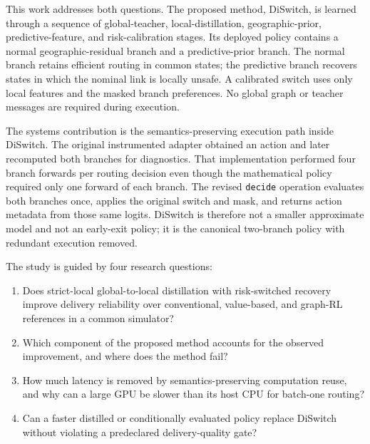 \documentclass{ieeeaccess}
\newcommand{\DS}{DiSwitch}
\begin{document}
This work addresses both questions. The proposed method, \DS{}, is learned through a sequence of global-teacher, local-distillation, geographic-prior, predictive-feature, and risk-calibration stages. Its deployed policy contains a normal geographic-residual branch and a predictive-prior branch. The normal branch retains efficient routing in common states; the predictive branch recovers states in which the nominal link is locally unsafe. A calibrated switch uses only local features and the masked branch preferences. No global graph or teacher messages are required during execution.

The systems contribution is the semantics-preserving execution path inside \DS{}. The original instrumented adapter obtained an action and later recomputed both branches for diagnostics. That implementation performed four branch forwards per routing decision even though the mathematical policy required only one forward of each branch. The revised \texttt{decide} operation evaluates both branches once, applies the original switch and mask, and returns action metadata from those same logits. \DS{} is therefore not a smaller approximate model and not an early-exit policy; it is the canonical two-branch policy with redundant execution removed.

The study is guided by four research questions:
\begin{enumerate}[leftmargin=*]
\item Does strict-local global-to-local distillation with risk-switched recovery improve delivery reliability over conventional, value-based, and graph-RL references in a common simulator?
\item Which component of the proposed method accounts for the observed improvement, and where does the method fail?
\item How much latency is removed by semantics-preserving computation reuse, and why can a large GPU be slower than its host CPU for batch-one routing?
\item Can a faster distilled or conditionally evaluated policy replace \DS{} without violating a predeclared delivery-quality gate?
\end{enumerate}
\end{document}
